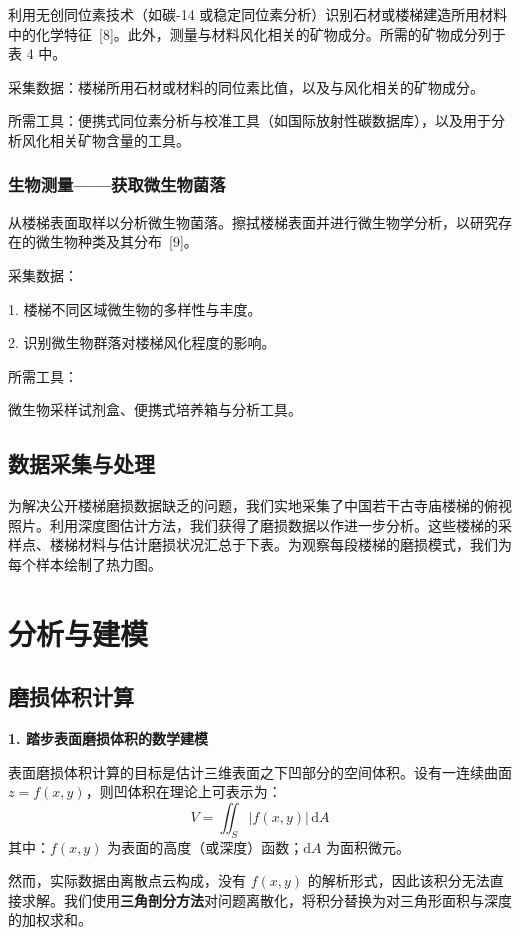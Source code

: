 \documentclass[11pt,a4paper]{ctexart}
\newcommand{\runin}[1]{\par\noindent\textbf{#1}\par\nobreak}
\begin{document}
利用无创同位素技术（如碳-14 或稳定同位素分析）识别石材或楼梯建造所用材料中的化学特征\ [8]。此外，测量与材料风化相关的矿物成分。所需的矿物成分列于表 4 中。

采集数据：楼梯所用石材或材料的同位素比值，以及与风化相关的矿物成分。

所需工具：便携式同位素分析与校准工具（如国际放射性碳数据库），以及用于分析风化相关矿物含量的工具。

\subsubsection{生物测量——获取微生物菌落}

从楼梯表面取样以分析微生物菌落。擦拭楼梯表面并进行微生物学分析，以研究存在的微生物种类及其分布\ [9]。

采集数据：

1. 楼梯不同区域微生物的多样性与丰度。

2. 识别微生物群落对楼梯风化程度的影响。

所需工具：

微生物采样试剂盒、便携式培养箱与分析工具。

\subsection{数据采集与处理}

为解决公开楼梯磨损数据缺乏的问题，我们实地采集了中国若干古寺庙楼梯的俯视照片。利用深度图估计方法，我们获得了磨损数据以作进一步分析。这些楼梯的采样点、楼梯材料与估计磨损状况汇总于下表。为观察每段楼梯的磨损模式，我们为每个样本绘制了热力图。

\section{分析与建模}

\subsection{磨损体积计算}

\runin{1. 踏步表面磨损体积的数学建模}

表面磨损体积计算的目标是估计三维表面之下凹部分的空间体积。设有一连续曲面 $z=f(x,y)$，则凹体积在理论上可表示为：
\begin{equation}
V=\iint_{S}|f(x,y)|\,\mathrm{d}A \tag{1}
\end{equation}
其中：$f(x,y)$ 为表面的高度（或深度）函数；$\mathrm{d}A$ 为面积微元。

然而，实际数据由离散点云构成，没有 $f(x,y)$ 的解析形式，因此该积分无法直接求解。我们使用\textbf{三角剖分方法}对问题离散化，将积分替换为对三角形面积与深度的加权求和。
\end{document}
